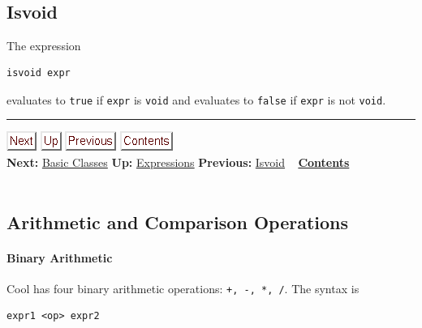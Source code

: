 \documentclass[]{article}
\begin{document}
\subsection{\\ Isvoid}

The expression

\begin{verbatim}
isvoid expr
\end{verbatim}

evaluates to \texttt{true} if \texttt{expr} is \texttt{void} and
evaluates to \texttt{false} if \texttt{expr} is not \texttt{void}.

\begin{center}\rule{3in}{0.4pt}\end{center}

\href{node26.html}{\includegraphics{next.png}}
\href{node13.html}{\includegraphics{up.png}}
\href{node24.html}{\includegraphics{prev.png}}
\href{node1.html}{\includegraphics{contents.png}} \\ \textbf{Next:}
\href{node26.html}{Basic Classes} \textbf{Up:}
\href{node13.html}{Expressions} \textbf{Previous:}
\href{node24.html}{Isvoid} ~ \textbf{\href{node1.html}{Contents}} \\ \\

\subsection{Arithmetic and Comparison Operations}

\paragraph{Binary Arithmetic}

Cool has four binary arithmetic operations: \texttt{+, -, *, /}. The
syntax is

\begin{verbatim}
expr1 <op> expr2
\end{verbatim}
\end{document}
